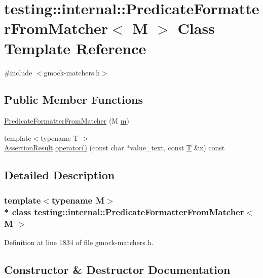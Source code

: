\hypertarget{classtesting_1_1internal_1_1_predicate_formatter_from_matcher}{}\section{testing\+:\+:internal\+:\+:Predicate\+Formatter\+From\+Matcher$<$ M $>$ Class Template Reference}
\label{classtesting_1_1internal_1_1_predicate_formatter_from_matcher}


{\ttfamily \#include $<$gmock-\/matchers.\+h$>$}

\subsection*{Public Member Functions}
\begin{DoxyCompactItemize}
\item 
\hyperlink{classtesting_1_1internal_1_1_predicate_formatter_from_matcher_aa0c40eca009c31e25738520dea0bc98c}{Predicate\+Formatter\+From\+Matcher} (M \hyperlink{variables__e_8js_aab4247b6acebcba996939b177f483c14}{m})
\item 
{\footnotesize template$<$typename T $>$ }\\\hyperlink{classtesting_1_1_assertion_result}{Assertion\+Result} \hyperlink{classtesting_1_1internal_1_1_predicate_formatter_from_matcher_a9b2ba1b95b3037e6f566062ae4ea4484}{operator()} (const char $\ast$value\+\_\+text, const \hyperlink{functions__7_8js_adf1f3edb9115acb0a1e04209b7a9937b}{T} \&x) const 
\end{DoxyCompactItemize}


\subsection{Detailed Description}
\subsubsection*{template$<$typename M$>$\\*
class testing\+::internal\+::\+Predicate\+Formatter\+From\+Matcher$<$ M $>$}



Definition at line 1834 of file gmock-\/matchers.\+h.



\subsection{Constructor \& Destructor Documentation}
